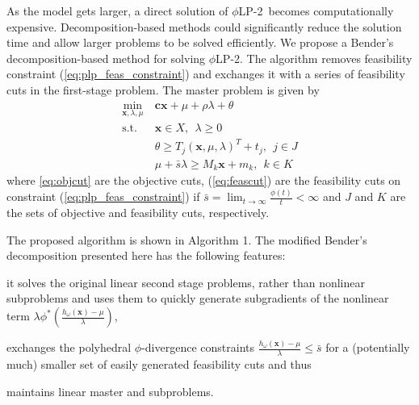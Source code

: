 \documentclass[opre,nonblindrev]{informs3} %
\newcommand{\x}{\mathbf{x}}
\renewcommand{\c}{\mathbf{c}}
\newcommand{\st}{\mbox{s.t.}}
\newcommand{\plp}{$\phi$LP-2}
\begin{document}
As the model gets larger, a direct solution of \plp\ becomes computationally expensive. 
Decomposition-based methods could significantly reduce the solution time and allow larger problems to be solved efficiently. We propose a Bender's decomposition-based method for solving \plp.
The algorithm removes feasibility constraint (\ref{eq:plp_feas_constraint})  and exchanges it with a series of feasibility cuts in the first-stage problem.
The master problem is given by
\begin{align}
	\min_{\x,\lambda,\mu} \ & \c\x + \mu + \rho \lambda + \theta \label{eq:master_problem}\\
	\st \ & \x \in X,\ \ \lambda \geq 0 \nonumber  \\
	& \theta \geq T_j (\x,\mu,\lambda)^T + t_j, \ \  j \in J  \label{eq:objcut} \\
	& \mu + \bar{s}\lambda \geq M_k \x + m_k, \ \ k \in K \label{eq:feascut} 
\end{align}
where \eqref{eq:objcut} are the objective cuts, (\ref{eq:feascut}) are the feasibility cuts on constraint (\ref{eq:plp_feas_constraint}) if $\bar{s} = \lim_{t \rightarrow \infty} \frac{\phi(t)}{t} < \infty$ and $J$ and $K$ are the sets of objective and feasibility cuts, respectively.

The proposed algorithm is shown in Algorithm 1. 
The modified Bender's decomposition presented here has the following features:
\begin{inparaenum}
	\item it solves the original linear second stage problems, rather than nonlinear subproblems and uses them to quickly generate subgradients of the nonlinear term $\lambda \phi^*\left(\tfrac{h_\omega(\x) - \mu}{\lambda}\right)$, 
	\item exchanges the polyhedral $\phi$-divergence constraints $\tfrac{h_\omega(\x) - \mu}{\lambda} \leq \bar{s}$ for a (potentially much) smaller set of easily generated feasibility cuts and thus
	\item  maintains linear master and subproblems.\medskip
\end{inparaenum}
\end{document}
